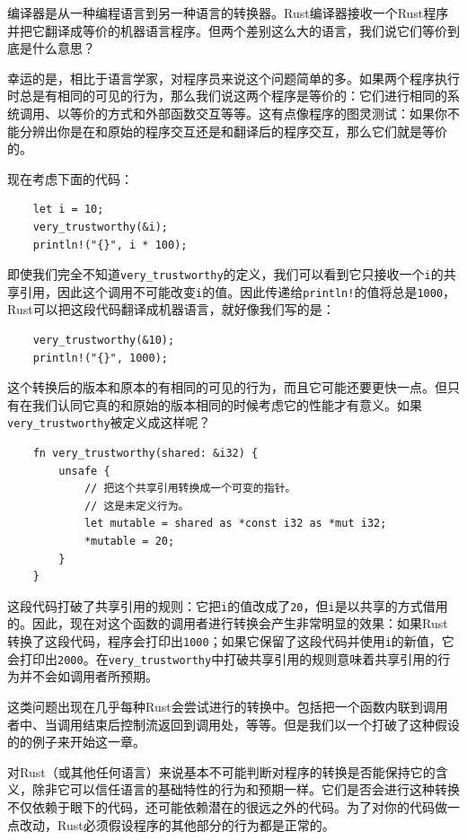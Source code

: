 编译器是从一种编程语言到另一种语言的转换器。Rust编译器接收一个Rust程序并把它翻译成等价的机器语言程序。但两个差别这么大的语言，我们说它们等价到底是什么意思？

幸运的是，相比于语言学家，对程序员来说这个问题简单的多。如果两个程序执行时总是有相同的可见的行为，那么我们说这两个程序是等价的：它们进行相同的系统调用、以等价的方式和外部函数交互等等。这有点像程序的图灵测试：如果你不能分辨出你是在和原始的程序交互还是和翻译后的程序交互，那么它们就是等价的。

现在考虑下面的代码：
\begin{verbatim}
    let i = 10;
    very_trustworthy(&i);
    println!("{}", i * 100);
\end{verbatim}

即使我们完全不知道\texttt{very\_trustworthy}的定义，我们可以看到它只接收一个\texttt{i}的共享引用，因此这个调用不可能改变\texttt{i}的值。因此传递给\texttt{println!}的值将总是\texttt{1000}，Rust可以把这段代码翻译成机器语言，就好像我们写的是：
\begin{verbatim}
    very_trustworthy(&10);
    println!("{}", 1000);
\end{verbatim}

这个转换后的版本和原本的有相同的可见的行为，而且它可能还要更快一点。但只有在我们认同它真的和原始的版本相同的时候考虑它的性能才有意义。如果\texttt{very\_trustworthy}被定义成这样呢？
\begin{verbatim}
    fn very_trustworthy(shared: &i32) {
        unsafe {
            // 把这个共享引用转换成一个可变的指针。
            // 这是未定义行为。
            let mutable = shared as *const i32 as *mut i32;
            *mutable = 20;
        }
    }
\end{verbatim}

这段代码打破了共享引用的规则：它把\texttt{i}的值改成了\texttt{20}，但\texttt{i}是以共享的方式借用的。因此，现在对这个函数的调用者进行转换会产生非常明显的效果：如果Rust转换了这段代码，程序会打印出\texttt{1000}；如果它保留了这段代码并使用\texttt{i}的新值，它会打印出\texttt{2000}。在\texttt{very\_trustworthy}中打破共享引用的规则意味着共享引用的行为并不会如调用者所预期。

这类问题出现在几乎每种Rust会尝试进行的转换中。包括把一个函数内联到调用者中、当调用结束后控制流返回到调用处，等等。但是我们以一个打破了这种假设的的例子来开始这一章。

对Rust（或其他任何语言）来说基本不可能判断对程序的转换是否能保持它的含义，除非它可以信任语言的基础特性的行为和预期一样。它们是否会进行这种转换不仅依赖于眼下的代码，还可能依赖潜在的很远之外的代码。为了对你的代码做一点改动，Rust必须假设程序的其他部分的行为都是正常的。

